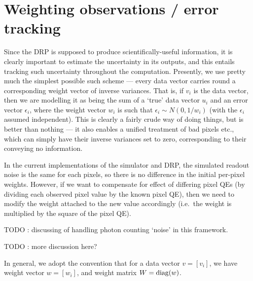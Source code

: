 \section{Weighting observations / error tracking}
\label{sec:weighting}

Since the DRP is supposed to produce scientifically-useful information,
it is clearly important to estimate the uncertainty in its outputs,
and this entails tracking such uncertainty throughout the computation.
Presently, we use pretty much the simplest possible such scheme ---
every data vector carries round a corresponding weight vector of inverse
variances. That is, if $v_i$ is the data vector, then we are modelling
it as being the sum of a `true' data vector $u_i$ and an error vector
$\epsilon_i$, where the weight vector $w_i$ is such that $\epsilon_i
\sim N(0, 1/w_i)$ (with the $\epsilon_i$ assumed independent).
This is clearly a fairly crude way of doing things, but is better
than nothing --- it also enables a unified treatment of bad pixels etc.,
which can simply have their inverse variances set to zero, corresponding
to their conveying no information.

In the current implementations of the simulator and DRP, the simulated
readout noise is the same for each pixels, so there is no difference in
the initial per-pixel weights. However, if we want to compensate for
effect of differing pixel QEs (by dividing each observed pixel value by
the known pixel QE), then we need to modify the weight attached to the
new value accordingly (i.e.\ the weight is multiplied by the square of
the pixel QE).

TODO : discussing of handling photon counting `noise' in this framework.

TODO : more discussion here?

In general, we adopt the convention that for a data vector $v = [v_i]$, we
have weight vector $w = [w_i]$, and weight matrix $W = {\rm diag}(w)$.
